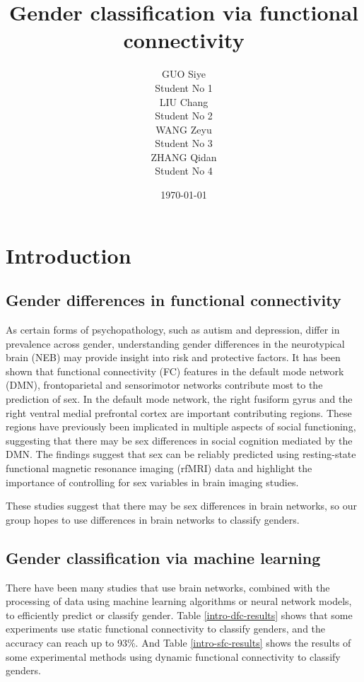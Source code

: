 \documentclass[11pt]{article}
\title{\Huge Gender classification via functional connectivity}
\author{
    \parbox{0.2\textwidth}{
        \centering GUO Siye \\
        \centering Student No 1
    }
    \parbox{0.2\textwidth}{
        \centering LIU Chang \\
        \centering Student No 2
    }
    \parbox{0.2\textwidth}{
        \centering WANG Zeyu \\
        \centering Student No 3
    }
    \parbox{0.2\textwidth}{
        \centering ZHANG Qidan \\
        \centering Student No 4
    }
}
\date{\today}
\begin{document}
\maketitle

\begin{abstract}

\end{abstract}

\newpage

\tableofcontents
\thispagestyle{empty}
\setcounter{page}{0}

\newpage

\section{Introduction}

\subsection{Gender differences in functional connectivity}

As certain forms of psychopathology, such as autism and depression, differ in prevalence across gender, understanding gender differences in the neurotypical brain (NEB) may provide insight into risk and protective factors. It has been shown that functional connectivity (FC) features in the default mode network (DMN), frontoparietal and sensorimotor networks contribute most to the prediction of sex. In the default mode network, the right fusiform gyrus and the right ventral medial prefrontal cortex are important contributing regions. These regions have previously been implicated in multiple aspects of social functioning, suggesting that there may be sex differences in social cognition mediated by the DMN. The findings suggest that sex can be reliably predicted using resting-state functional magnetic resonance imaging (rfMRI) data and highlight the importance of controlling for sex variables in brain imaging studies.

These studies suggest that there may be sex differences in brain networks, so our group hopes to use differences in brain networks to classify genders.

\subsection{Gender classification via machine learning}

There have been many studies that use brain networks, combined with the processing of data using machine learning algorithms or neural network models, to efficiently predict or classify gender. Table \ref{intro-dfc-results} shows that some experiments use static functional connectivity to classify genders, and the accuracy can reach up to 93\%. And Table \ref{intro-sfc-results} shows the results of some experimental methods using dynamic functional connectivity to classify genders.
\end{document}
